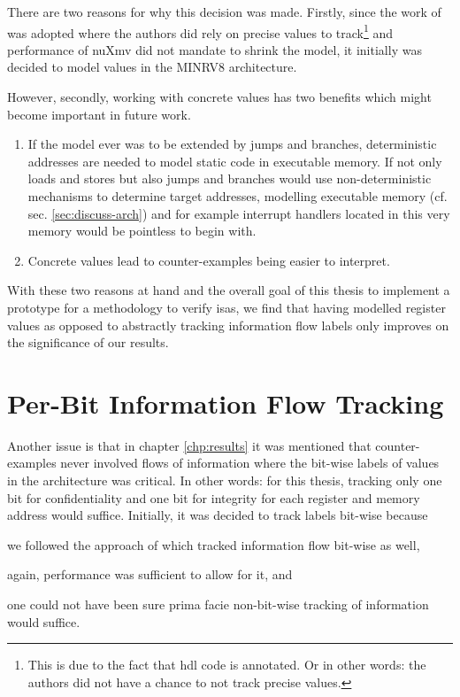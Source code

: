 There are two reasons for why this decision was made.
Firstly, since the work of \citeauthor{Ferraiuolo17} \cite{Ferraiuolo17} was adopted where the authors did rely on precise values to track\footnote{%
    This is due to the fact that \gls{hdl} code is annotated.
    Or in other words: the authors did not have a chance to not track precise values.
} and performance of nuXmv did not mandate to shrink the model, it initially was decided to model values in the MINRV8 architecture.

However, secondly, working with concrete values has two benefits which might become important in future work.
\begin{enumerate}
    \item If the model ever was to be extended by jumps and branches, deterministic addresses are needed to model static code in executable memory.
    If not only loads and stores but also jumps and branches would use non-deterministic mechanisms to determine target addresses, modelling executable memory (cf. sec. \ref{sec:discuss-arch}) and for example interrupt handlers located in this very memory would be pointless to begin with.
    \item Concrete values lead to counter-examples being easier to interpret.
\end{enumerate}

With these two reasons at hand and the overall goal of this thesis to implement a prototype for a methodology to verify \glspl{isa}, we find that having modelled register values as opposed to abstractly tracking information flow labels only improves on the significance of our results.

\section{Per-Bit Information Flow Tracking}
\label{sec:per-bit-tracking}

Another issue is that in chapter \ref{chp:results} it was mentioned that counter-examples never involved flows of information where the bit-wise labels of values in the architecture was critical.
In other words: for this thesis, tracking only one bit for confidentiality and one bit for integrity for each register and memory address would suffice.
Initially, it was decided to track labels bit-wise because \begin{enumerate*}[label=\alph*)]
    \item we followed the approach of \citeauthor{Ferraiuolo17} \cite{Ferraiuolo17} which tracked information flow bit-wise as well,
    \item again, performance was sufficient to allow for it, and
    \item one could not have been sure prima facie non-bit-wise tracking of information would suffice.
\end{enumerate*}

